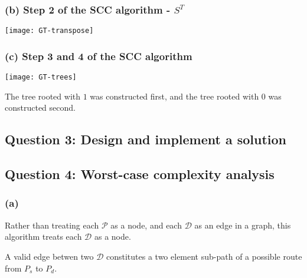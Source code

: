 \documentclass[11pt,a4paper]{article}
\begin{document}
\subsubsection*{(b) Step 2 of the SCC algorithm - $S^T$}

\texttt{[image: GT-transpose]}

\subsubsection*{(c) Step 3 and 4 of the SCC algorithm}

\texttt{[image: GT-trees]}

The tree rooted with $1$ was constructed first, and the tree rooted with $0$ was constructed second.

\newpage

\subsection*{Question 3: Design and implement a solution}

\subsection*{Question 4: Worst-case complexity analysis}


\subsubsection*{(a)}

Rather than treating each $\mathcal{P}$ as a node, and each $\mathcal{D}$ as an edge in a graph, this algorithm treats each $\mathcal{D}$ as a node. 

A valid edge betwen two $\mathcal{D}$ constitutes a two element sub-path of a possible route from $P_s$ to $P_d$.


\begingroup
\fontsize{11pt}{11pt}\selectfont
 
\endgroup
\end{document}
